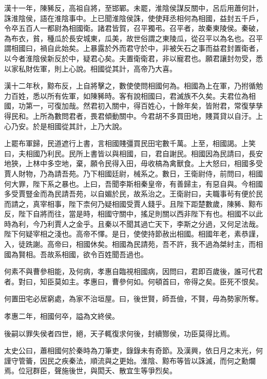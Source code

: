 漢十一年，陳豨反，高祖自將，至邯鄲。未罷，淮陰侯謀反關中，呂后用蕭何計，誅淮陰侯，語在淮陰事中。上已聞淮陰侯誅，使使拜丞相何為相國，益封五千戶，令卒五百人一都尉為相國衛。諸君皆賀，召平獨弔。召平者，故秦東陵侯。秦破，為布衣，貧，種瓜於長安城東，瓜美，故世俗謂之東陵瓜，從召平以為名也。召平謂相國曰，禍自此始矣。上暴露於外而君守於中，非被矢石之事而益君封置衛者，以今者淮陰侯新反於中，疑君心矣。夫置衛衛君，非以寵君也。願君讓封勿受，悉以家私財佐軍，則上心說。相國從其計，高帝乃大喜。

漢十二年秋，黥布反，上自將擊之，數使使問相國何為。相國為上在軍，乃拊循勉力百姓，悉以所有佐軍，如陳豨時。客有說相國曰，君滅族不久矣。夫君位為相國，功第一，可復加哉。然君初入關中，得百姓心，十餘年矣，皆附君，常復孳孳得民和。上所為數問君者，畏君傾動關中。今君胡不多買田地，賤貰貸以自汙。上心乃安。於是相國從其計，上乃大說。

上罷布軍歸，民道遮行上書，言相國賤彊買民田宅數千萬。上至，相國謁。上笑曰，夫相國乃利民。民所上書皆以與相國，曰，君自謝民。相國因為民請曰，長安地狹，上林中多空地，棄，願令民得入田，毋收槁為禽獸食。上大怒曰，相國多受賈人財物，乃為請吾苑。乃下相國廷尉，械系之。數日，王衛尉侍，前問曰，相國何大罪，陛下系之暴也。上曰，吾聞李斯相秦皇帝，有善歸主，有惡自與。今相國多受賈豎金而為民請吾苑，以自媚於民，故系治之。王衛尉曰，夫職事茍有便於民而請之，真宰相事，陛下柰何乃疑相國受賈人錢乎。且陛下距楚數歲，陳豨、黥布反，陛下自將而往，當是時，相國守關中，搖足則關以西非陛下有也。相國不以此時為利，今乃利賈人之金乎。且秦以不聞其過亡天下，李斯之分過，又何足法哉。陛下何疑宰相之淺也。高帝不懌。是日，使使持節赦出相國。相國年老，素恭謹，入，徒跣謝。高帝曰，相國休矣。相國為民請苑，吾不許，我不過為桀紂主，而相國為賢相。吾故系相國，欲令百姓聞吾過也。

何素不與曹參相能，及何病，孝惠自臨視相國病，因問曰，君即百歲後，誰可代君者。對曰，知臣莫如主。孝惠曰，曹參何如。何頓首曰，帝得之矣。臣死不恨矣。

何置田宅必居窮處，為家不治垣屋。曰，後世賢，師吾儉，不賢，毋為勢家所奪。

孝惠二年，相國何卒，謚為文終侯。

後嗣以罪失侯者四世，絕，天子輒復求何後，封續酂侯，功臣莫得比焉。

太史公曰，蕭相國何於秦時為刀筆吏，錄錄未有奇節。及漢興，依日月之末光，何謹守管籥，因民之疾秦法，順流與之更始。淮陰、黥布等皆以誅滅，而何之勳爛焉。位冠群臣，聲施後世，與閎夭、散宜生等爭烈矣。